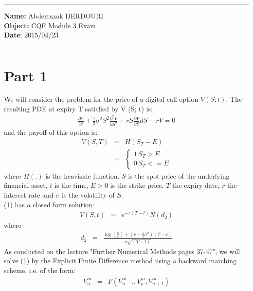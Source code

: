 \documentclass[11pt,oneside,a4paper, titlepage]{article}
\begin{document}
\hrule height 1pt
\vskip 0.2cm
\noindent \textbf{Name:} Abderrazak \textsc{DERDOURI}\\
\textbf{Object:} CQF Module 3 Exam\\
\textbf{Date}: 2015/04/23
\vskip 0.2cm
\hrule height 1pt
\section*{Part 1}
We will consider the problem for the price of a digital call option \(V (S; t)\).
The resulting PDE at expiry T satisfied by V (S; t)
is:
\begin{eqnarray}
\frac{\partial V}{\partial t} + \frac{1}{2} \sigma^2 S^2\frac{\partial^2 V}{\partial S^2} + rS\frac{\partial V}{\partial S}dS -rV=0
\end{eqnarray}
and the payoff of this option is: 
\begin{eqnarray*}
V(S, T)&=&H(S_T-E)\\
&=&\left\{ \begin{array}{ll}
1 \, S_T>E\\
0 \, S_T<=E
\end{array} \right.
\end{eqnarray*}
where \(H(.)\) is the heaviside function. \(S\) is the spot price of the underlying financial asset, \(t\) is the time,
\(E>0\) is the strike price, \(T\) the expiry date, \(r\) the interest rate and \(\sigma\) is the volatility of \(S\).\\
(1) has a closed form solution:
\begin{eqnarray*}
V(S, t)&=& e^{-r(T-t)}N(d_2)
\end{eqnarray*}
where 
\begin{eqnarray*}
d_2&=&\frac{\log(\frac{S}{k})+(r-\frac{1}{2}\sigma^2)(T-t)}{\sigma\sqrt{(T-t)}}
\end{eqnarray*}
As conducted on the lecture "Further Numerical Methods pages 37-47", we will solve (1) by the Explicit Finite Difference method using a backward marching scheme, i.e. of the form:
\begin{eqnarray*}
V_{n}^{m}&=&F(V_{n-1}^{m}, V_{n}^{m}, V_{n+1}^{m}) 
\end{eqnarray*}
\end{document}
